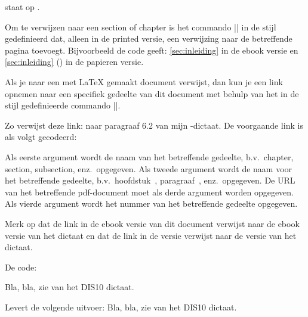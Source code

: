 \begin{lstfragment}[style = lstyle, alsoletter = :, emph=fig:zebra, emphstyle=\lstllabel]
 staat op .
\end{lstfragment}

Om te verwijzen naar een section of chapter is het commando |\csecref| in de stijl gedefinieerd dat, alleen in de printed versie, een verwijzing naar de betreffende pagina toevoegt.
Bijvoorbeeld de code  geeft: \cref{sec:inleiding} in de ebook versie en \cref{sec:inleiding} () in de papieren versie.

Als je naar een met \LaTeX{} gemaakt document verwijst, dan kun je een link opnemen naar een specifiek gedeelte van dit document met behulp van het in de stijl gedefinieerde
commando |\pdfdeelref|.

Zo verwijst deze link:
naar paragraaf 6.2 van mijn \Cpp{}-dictaat.
De voorgaande link is als volgt gecodeerd:

\begin{lstfragment}[style=lstyle]
\end{lstfragment}

Als eerste argument wordt de naam van het betreffende gedeelte, b.v.\ chapter, section, subsection, enz.\ opgegeven.
Als tweede argument wordt de naam voor het betreffende gedeelte,  b.v.\ hoofdstuk~, paragraaf~, enz.\ opgegeven.
De URL van het betreffende pdf\hyp{}document moet als derde argument worden opgegeven.
Als vierde argument wordt het nummer van het betreffende gedeelte opgegeven.

Merk op dat de link in de ebook versie van dit document verwijst naar de ebook versie van het dictaat en dat de link in de  versie verwijst
naar de  versie van het dictaat.

De code:
\begin{lstfragment}[style=lstyle]
Bla, bla, zie  van het DIS10 dictaat.
\end{lstfragment}
Levert de volgende uitvoer:
Bla, bla, zie
van het DIS10 dictaat.

